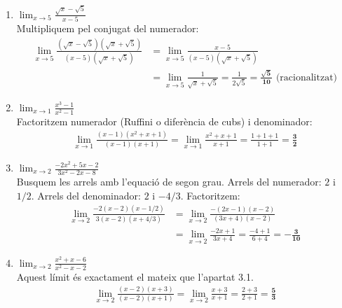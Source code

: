 \documentclass[12pt,a4paper]{article}
\begin{document}
\begin{enumerate}[label=\textbf{3.\arabic*.}, leftmargin=*, itemsep=0.8cm]
    \item $\displaystyle \lim_{x \to 5} \frac{\sqrt{x}-\sqrt{5}}{x-5}$ \\
    Multipliquem pel conjugat del numerador:
    \begin{align*}
        \lim_{x \to 5} \frac{(\sqrt{x}-\sqrt{5})(\sqrt{x}+\sqrt{5})}{(x-5)(\sqrt{x}+\sqrt{5})} &= \lim_{x \to 5} \frac{x-5}{(x-5)(\sqrt{x}+\sqrt{5})} \\
        &= \lim_{x \to 5} \frac{1}{\sqrt{x}+\sqrt{5}} = \frac{1}{2\sqrt{5}} = \mathbf{\frac{\sqrt{5}}{10}} \text{ (racionalitzat)}
    \end{align*}

    \item $\displaystyle \lim_{x \to 1} \frac{x^3-1}{x^2-1}$ \\
    Factoritzem numerador (Ruffini o diferència de cubs) i denominador:
    \begin{align*}
        \lim_{x \to 1} \frac{(x-1)(x^2+x+1)}{(x-1)(x+1)} = \lim_{x \to 1} \frac{x^2+x+1}{x+1} = \frac{1+1+1}{1+1} = \mathbf{\frac{3}{2}}
    \end{align*}

    \item $\displaystyle \lim_{x \to 2} \frac{-2x^2+5x-2}{3x^2-2x-8}$ \\
    Busquem les arrels amb l'equació de segon grau. Arrels del numerador: $2$ i $1/2$. Arrels del denominador: $2$ i $-4/3$. Factoritzem:
    \begin{align*}
        \lim_{x \to 2} \frac{-2(x-2)(x-1/2)}{3(x-2)(x+4/3)} &= \lim_{x \to 2} \frac{-(2x-1)(x-2)}{(3x+4)(x-2)} \\
        &= \lim_{x \to 2} \frac{-2x+1}{3x+4} = \frac{-4+1}{6+4} = \mathbf{-\frac{3}{10}}
    \end{align*}

    \item $\displaystyle \lim_{x \to 2} \frac{x^2+x-6}{x^2-x-2}$ \\
    Aquest límit és exactament el mateix que l'apartat 3.1.
    \begin{align*}
        \lim_{x \to 2} \frac{(x-2)(x+3)}{(x-2)(x+1)} = \lim_{x \to 2} \frac{x+3}{x+1} = \frac{2+3}{2+1} = \mathbf{\frac{5}{3}}
    \end{align*}

\end{enumerate}


\end{document}
